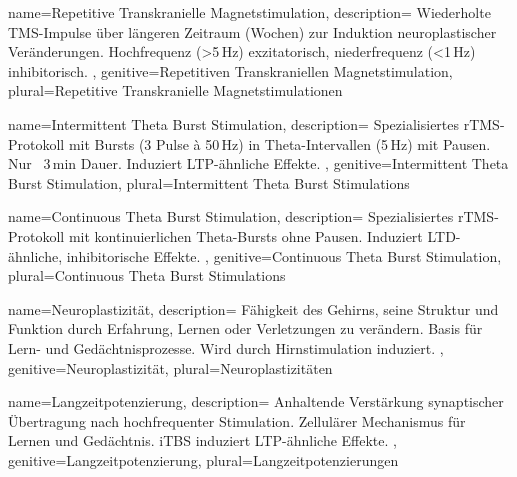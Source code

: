 
{
	name=Repetitive Transkranielle Magnetstimulation,
	description={
			Wiederholte \gls{TMS}-Impulse über längeren Zeitraum (Wochen) zur Induktion neuroplastischer Veränderungen. Hochfrequenz (>5\,Hz) exzitatorisch, niederfrequenz (<1\,Hz) inhibitorisch.
		},
	genitive=Repetitiven Transkraniellen Magnetstimulation,
	plural=Repetitive Transkranielle Magnetstimulationen
}


{
	name=Intermittent Theta Burst Stimulation,
	description={
			Spezialisiertes \gls{rTMS}-Protokoll mit Bursts (3 Pulse à 50\,Hz) in Theta-Intervallen (5\,Hz) mit Pausen. Nur ~3\,min Dauer. Induziert LTP-ähnliche Effekte. \cite{huang_theta_2005, hoy_enhancement_2016}
		},
	genitive=Intermittent Theta Burst Stimulation,
	plural=Intermittent Theta Burst Stimulations
}


{
	name=Continuous Theta Burst Stimulation,
	description={
			Spezialisiertes \gls{rTMS}-Protokoll mit kontinuierlichen Theta-Bursts ohne Pausen. Induziert LTD-ähnliche, inhibitorische Effekte. \cite{huang_theta_2005}
		},
	genitive=Continuous Theta Burst Stimulation,
	plural=Continuous Theta Burst Stimulations
}



{
	name=Neuroplastizität,
	description={
			Fähigkeit des Gehirns, seine Struktur und Funktion durch Erfahrung, Lernen oder Verletzungen zu verändern. Basis für Lern- und Gedächtnisprozesse. Wird durch Hirnstimulation induziert.
		},
	genitive=Neuroplastizität,
	plural=Neuroplastizitäten
}

{
	name=Langzeitpotenzierung,
	description={
			Anhaltende Verstärkung synaptischer Übertragung nach hochfrequenter Stimulation. Zellulärer Mechanismus für Lernen und Gedächtnis. \gls{iTBS} induziert LTP-ähnliche Effekte. \cite{esser_level_2006, cavaleiro_memory_2020}
		},
	genitive=Langzeitpotenzierung,
	plural=Langzeitpotenzierungen
}

